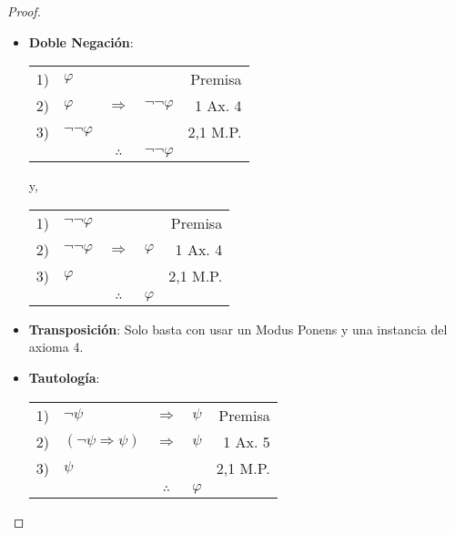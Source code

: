 \documentclass[12pt]{report}
\theoremstyle{largebreak}
\begin{document}
    \begin{proof}
        \begin{itemize}
            \item \textbf{Doble Negación}:
            \begin{center}
                \begin{tabular}{l l c l r}
                    1) & $\varphi$ &  &  & Premisa \\
                    2) & $\varphi$ & $\Rightarrow$ & $\neg\neg\varphi$ & 1 Ax. 4 \\
                    3) & $\neg\neg\varphi$ &  &  & 2,1 M.P. \\
                    \hline
                    & & $\therefore$ & $\neg\neg\varphi$ & \\
                \end{tabular}
            \end{center}
            y,
            \begin{center}
                \begin{tabular}{l l c l r}
                    1) & $\neg\neg\varphi$ &  &  & Premisa \\
                    2) & $\neg\neg\varphi$ & $\Rightarrow$ & $\varphi$ & 1 Ax. 4 \\
                    3) & $\varphi$ &  &  & 2,1 M.P. \\
                    \hline
                    & & $\therefore$ & $\varphi$ & \\
                \end{tabular}
            \end{center}
            \item \textbf{Transposición}: Solo basta con usar un Modus Ponens y una instancia del axioma 4.
            \item \textbf{Tautología}:
            \begin{center}
                \begin{tabular}{l l c l r}
                    1) & $\neg\psi$ & $\Rightarrow$ & $\psi$ & Premisa \\
                    2) & $(\neg\psi\Rightarrow\psi)$ & $\Rightarrow$ & $\psi$ & 1 Ax. 5 \\
                    3) & $\psi$ &  &  & 2,1  M.P. \\
                    \hline
                    & & $\therefore$ & $\varphi$ & \\
                \end{tabular}
            \end{center}
        \end{itemize}
    \end{proof}
\end{document}
